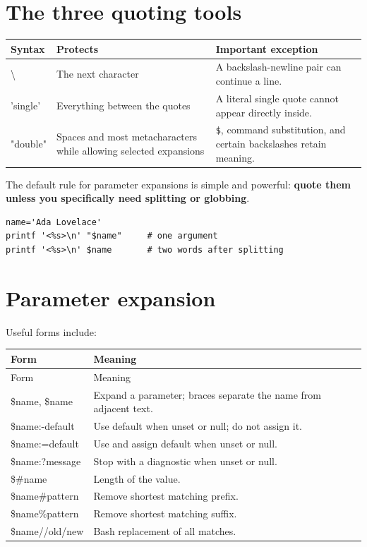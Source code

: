 \documentclass[11pt,oneside,openany]{book}
\begin{document}
\section{The three quoting tools}
\begin{center}
\begin{tabularx}{0.96\textwidth}{>{\ttfamily}p{}X X}
\toprule
Syntax & Protects & Important exception \\
\midrule
\textbackslash & The next character & A backslash-newline pair can continue a line. \\
'single' & Everything between the quotes & A literal single quote cannot appear directly inside. \\
"double" & Spaces and most metacharacters while allowing selected expansions & \texttt{\$}, command substitution, and certain backslashes retain meaning. \\
\bottomrule
\end{tabularx}
\end{center}

The default rule for parameter expansions is simple and powerful: \textbf{quote them unless you specifically need splitting or globbing}.
\begin{lstlisting}
name='Ada Lovelace'
printf '<%s>\n' "$name"     # one argument
printf '<%s>\n' $name       # two words after splitting
\end{lstlisting}

\section{Parameter expansion}
Useful forms include:
\begin{longtable}{>{\ttfamily}p{}p{}}
\toprule
Form & Meaning \\
\midrule
\endfirsthead
\toprule Form & Meaning \\
\midrule\endhead
\$name, \${name} & Expand a parameter; braces separate the name from adjacent text. \\
\${name:-default} & Use default when unset or null; do not assign it. \\
\${name:=default} & Use and assign default when unset or null. \\
\${name:?message} & Stop with a diagnostic when unset or null. \\
\${\#name} & Length of the value. \\
\${name\#pattern} & Remove shortest matching prefix. \\
\${name\%pattern} & Remove shortest matching suffix. \\
\${name//old/new} & Bash replacement of all matches. \\
\bottomrule
\end{longtable}
\end{document}
